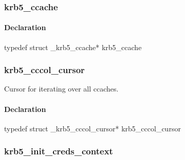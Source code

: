 \documentclass[letterpaper,10pt,english]{sphinxmanual}
\begin{document}
\subsubsection{krb5\_ccache}
\label{appdev/refs/types/krb5_ccache:krb5-ccache-struct}\label{appdev/refs/types/krb5_ccache::doc}\label{appdev/refs/types/krb5_ccache:krb5-ccache}

\begin{fulllineitems}
\label{appdev/refs/types/krb5_ccache:c.krb5_ccache}
\end{fulllineitems}



\paragraph{Declaration}
\label{appdev/refs/types/krb5_ccache:declaration}
typedef struct \_krb5\_ccache* krb5\_ccache


\subsubsection{krb5\_cccol\_cursor}
\label{appdev/refs/types/krb5_cccol_cursor:krb5-cccol-cursor-struct}\label{appdev/refs/types/krb5_cccol_cursor::doc}\label{appdev/refs/types/krb5_cccol_cursor:krb5-cccol-cursor}

\begin{fulllineitems}
\label{appdev/refs/types/krb5_cccol_cursor:c.krb5_cccol_cursor}
\end{fulllineitems}


Cursor for iterating over all ccaches.


\paragraph{Declaration}
\label{appdev/refs/types/krb5_cccol_cursor:declaration}
typedef struct \_krb5\_cccol\_cursor* krb5\_cccol\_cursor


\subsubsection{krb5\_init\_creds\_context}
\label{appdev/refs/types/krb5_init_creds_context:krb5-init-creds-context}\label{appdev/refs/types/krb5_init_creds_context::doc}\label{appdev/refs/types/krb5_init_creds_context:krb5-init-creds-context-struct}
\end{document}
